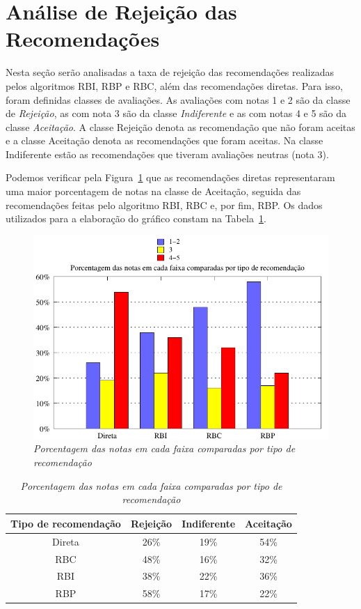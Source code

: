 \section{Análise de Rejeição das Recomendações}
\label{sec:analise_de_rejeicao_das_recomendacoes}

 Nesta seção serão analisadas a taxa de rejeição das recomendações realizadas pelos algoritmos RBI, RBP e RBC, além das recomendações diretas. Para isso, foram definidas classes de avaliações. As avaliações com notas 1 e 2 são da classe de \textit{Rejeição}, as com nota 3 são da classe \textit{Indiferente} e as com notas 4 e 5 são da classe \textit{Aceitação}. A classe Rejeição denota as recomendação que não foram aceitas e a classe Aceitação denota as recomendações que foram aceitas. Na classe Indiferente estão as recomendações que tiveram avaliações neutras (nota 3).

 Podemos verificar pela Figura~\ref{fig:notas} que as recomendações diretas representaram uma maior porcentagem de notas na classe de Aceitação, seguida das recomendações feitas pelo algoritmo RBI, RBC e, por fim, RBP. Os dados utilizados para a elaboração do gráfico constam na Tabela~\ref{table:notas}.
 
\begin{figure}
    \centering
    \includegraphics[width=\textwidth]{imagens/grafico_notas}
    \caption{\it Porcentagem das notas em cada faixa comparadas por tipo de recomendação}
    \label{fig:notas}
\end{figure}

\begin{table}
\centering
\begin{tabular}{c c c c} 
    \hline \hline
    \textbf{Tipo de recomendação} & \textbf{Rejeição}& \textbf{Indiferente}& \textbf{Aceitação} \\
\hline 
Direta & 26\% & 19\% & 54\% \\
\hline 
RBC & 48\% & 16\% & 32\% \\
\hline 
RBI & 38\% & 22\% & 36\% \\
\hline 
RBP & 58\% & 17\% & 22\% \\
\hline        
\end{tabular}
\caption{\it Porcentagem das notas em cada faixa comparadas por tipo de recomendação}
\label{table:notas}
\end{table}

